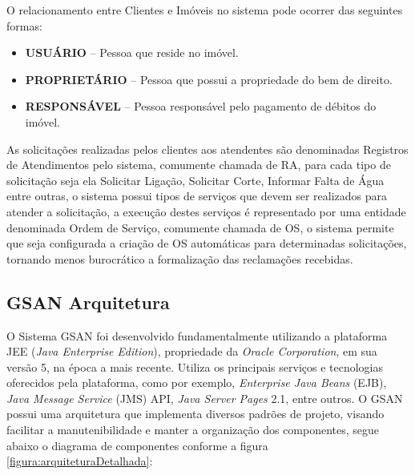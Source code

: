 O relacionamento entre Clientes e Imóveis no sistema pode ocorrer das seguintes formas:

\begin{itemize}
	\item \textbf{USUÁRIO} – Pessoa que reside no imóvel.
	\item \textbf{PROPRIETÁRIO} – Pessoa que possui a propriedade do bem de direito.
	\item \textbf{RESPONSÁVEL} – Pessoa responsável pelo pagamento de débitos do imóvel.	
\end{itemize}

As solicitações realizadas pelos clientes aos atendentes são denominadas Registros de Atendimentos pelo sistema, comumente chamada de RA, para cada tipo de solicitação seja ela Solicitar Ligação, Solicitar Corte, Informar Falta de Água entre outras, o sistema possui tipos de serviços que devem ser realizados para atender a solicitação, a execução destes serviços é representado por uma  entidade denominada Ordem de Serviço, comumente chamada de OS, o sistema permite que seja configurada a criação de OS automáticas para determinadas solicitações, tornando menos burocrático a formalização das reclamações recebidas.



\subsection{GSAN Arquitetura}
	
O Sistema GSAN foi desenvolvido fundamentalmente utilizando a plataforma JEE (\textit{Java Enterprise Edition}), propriedade da \textit{Oracle Corporation}, em sua versão 5, na época a mais recente. Utiliza os principais serviços e tecnologias oferecidos pela plataforma, como por exemplo, \textit{Enterprise Java Beans} (EJB), \textit{Java Message Service} (JMS) API, \textit{Java Server Pages} 2.1, entre outros.
O GSAN possui uma arquitetura que implementa diversos padrões de projeto, visando facilitar a manutenibilidade e manter a organização dos componentes, segue abaixo o diagrama de componentes conforme a figura \ref{figura:arquiteturaDetalhada}:

